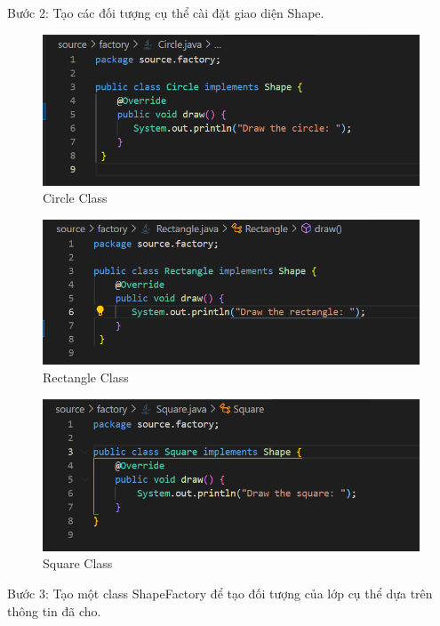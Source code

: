 \newpage
Bước 2: Tạo các đối tượng cụ thể cài đặt giao diện Shape.
\begin{figure}[!htb]
    \centering
    \includegraphics[width=\textwidth]{fig/Factory/circle_class.png}
    \caption{Circle Class}
    \label{fig:circle_class}
\end{figure}

\begin{figure}[!htb]
    \centering
    \includegraphics[width=\textwidth]{fig/Factory/rectangle_class.png}
    \caption{Rectangle Class}
    \label{fig:rectangle_class}
\end{figure}

\begin{figure}[!htb]
    \centering
    \includegraphics[width=\textwidth]{fig/Factory/square_class.png}
    \caption{Square Class}
    \label{fig:square_class}
\end{figure}

\newpage
Bước 3: Tạo một class ShapeFactory để tạo đối tượng của lớp cụ thể dựa trên thông tin đã cho.

